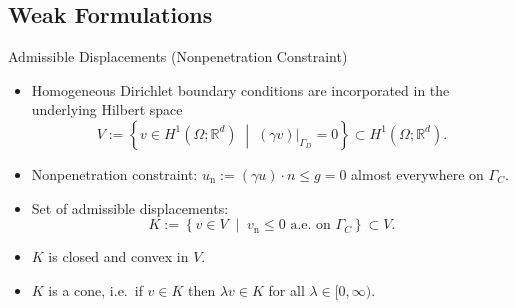 \documentclass[10pt,aspectratio=169]{beamer}
\def\R{{\mathbb R}}
\begin{document}
\subsection{Weak Formulations}
\begin{frame}{Admissible Displacements (Nonpenetration Constraint)}
	\begin{itemize}
		\item Homogeneous Dirichlet boundary conditions are incorporated in the underlying Hilbert space
		      \begin{equation*}
			      V:=\left\{ v\in H^1(\Omega;\R^d)\;\middle|\; (\gamma v)|_{\Gamma_D}=0\right\}\subset H^1(\Omega;\R^d).
		      \end{equation*}
		\item Nonpenetration constraint: $u_\mathrm{n}:= (\gamma u)\cdot n\le g = 0$ almost everywhere on $\Gamma_C$.
		\item Set of admissible displacements:
		      \begin{equation*}
			      K := \left\{ v\in V\;\middle|\; v_{\mathrm n}\le 0 \text{ a.e.\ on }\Gamma_C\right\}\subset V.
		      \end{equation*}
		\item $K$ is closed and convex in $V$.
		\item $K$ is a cone, i.e.\ if $v\in K$ then $\lambda v\in K$ for all $\lambda\in [0,\infty)$.
	\end{itemize}
\end{frame}
\end{document}
